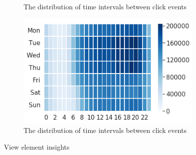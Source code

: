 \begin{figure}[htbp!]
\begin{subfigure}[b]{0.3\textwidth}
    \caption{The distribution of time intervals between click events}
    \label{fig:zhou_event_time_intervals}
  \end{subfigure}
  \hfill
  \begin{subfigure}[b]{0.3\textwidth}
    \centering
    \includegraphics[width=\textwidth]{graphics/zhou_event_time_distribution}
    \caption{The distribution of time intervals between click events}
    \label{fig:zhou_event_time_distribution}
  \end{subfigure}
  \caption[View element insights]{View element insights \cite{zhou2021large}}
  \label{fig:zhou_graphs}
\end{figure}

